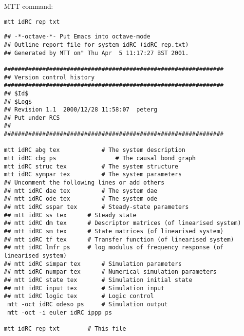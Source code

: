 MTT command:
\begin{verbatim}
mtt idRC rep txt 
\end{verbatim}
  \begin{verbatim}
## -*-octave-*- Put Emacs into octave-mode
## Outline report file for system idRC (idRC_rep.txt)
## Generated by MTT on" Thu Apr  5 11:17:27 BST 2001.

###############################################################
## Version control history
###############################################################
## $Id$
## $Log$
## Revision 1.1  2000/12/28 11:58:07  peterg
## Put under RCS
##
###############################################################

mtt idRC abg tex			# The system description
mtt idRC cbg ps 		        # The causal bond graph
mtt idRC struc tex	        # The system structure
mtt idRC sympar tex	        # The system parameters
## Uncomment the following lines or add others
## mtt idRC dae tex	        # The system dae
## mtt idRC ode tex	        # The system ode 
## mtt idRC sspar tex		# Steady-state parameters
## mtt idRC ss tex 		# Steady state
## mtt idRC dm tex		# Descriptor matrices (of linearised system)
## mtt idRC sm tex		# State matrices (of linearised system)
## mtt idRC tf tex		# Transfer function (of linearised system)
## mtt idRC lmfr ps		# log modulus of frequency response (of linearised system)
## mtt idRC simpar tex		# Simulation parameters
## mtt idRC numpar tex		# Numerical simulation parameters
## mtt idRC state tex		# Simulation initial state
## mtt idRC input tex		# Simulation input
## mtt idRC logic tex		# Logic control
 mtt -oct idRC odeso ps		# Simulation output
 mtt -oct -i euler idRC ippp ps

mtt idRC rep txt		# This file
  \end{verbatim}
